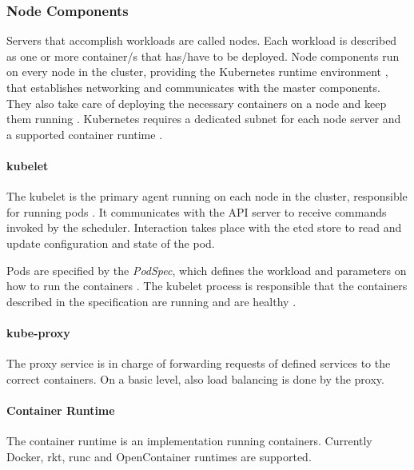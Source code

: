 \subsubsection{Node Components}\label{node-components}

Servers that accomplish workloads are called nodes. Each workload is
described as one or more container/s that has/have to be deployed. Node
components run on every node in the cluster, providing the Kubernetes
runtime environment \cite{kub_comp}, that establishes networking and
communicates with the master components. They also take care of
deploying the necessary containers on a node and keep them running
\cite{kub_intro}. Kubernetes requires a dedicated subnet for each node
server and a supported container runtime \cite{kub_comp}.

\paragraph{kubelet}\label{kubelet}

The kubelet is the primary agent running on each node in the cluster,
responsible for running pods \cite{kub_comp}. It communicates with the
API server to receive commands invoked by the scheduler. Interaction
takes place with the etcd store to read and update configuration and
state of the pod.

Pods are specified by the \emph{PodSpec}, which defines the workload and
parameters on how to run the containers \cite{kub_intro}. The kubelet
process is responsible that the containers described in the
specification are running and are healthy \cite{kub_comp}.

\paragraph{kube-proxy}\label{kube-proxy}

The proxy service is in charge of forwarding requests of defined
services to the correct containers. On a basic level, also load
balancing is done by the proxy. \cite{baier-kub}

\paragraph{Container Runtime}\label{container-runtime}

The container runtime is an implementation running containers. Currently
Docker, rkt, runc and OpenContainer runtimes are supported.
\cite{kub_comp}

